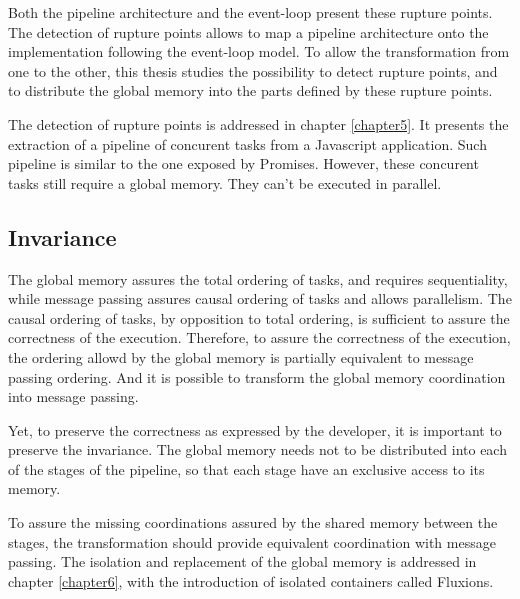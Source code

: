 Both the pipeline architecture and the event-loop present these rupture points.
The detection of rupture points allows to map a pipeline architecture onto the implementation following the event-loop model.
To allow the transformation from one to the other, this thesis studies the possibility to detect rupture points, and to distribute the global memory into the parts defined by these rupture points.

The detection of rupture points is addressed in chapter \ref{chapter5}.
It presents the extraction of a pipeline of concurent tasks from a Javascript application.
Such pipeline is similar to the one exposed by Promises.
However, these concurent tasks still require a global memory.
They can't be executed in parallel.

\subsection{Invariance}


The global memory assures the total ordering of tasks, and requires sequentiality, while message passing assures causal ordering of tasks and allows parallelism.
The causal ordering of tasks, by opposition to total ordering, is sufficient to assure the correctness of the execution.
Therefore, to assure the correctness of the execution, the ordering allowd by the global memory is partially equivalent to message passing ordering.
And it is possible to transform the global memory coordination into message passing.

Yet, to preserve the correctness as expressed by the developer, it is important to preserve the invariance.
The global memory needs not to be distributed into each of the stages of the pipeline, so that each stage have an exclusive access to its memory.

To assure the missing coordinations assured by the shared memory between the stages, the transformation should provide equivalent coordination with message passing.
The isolation and replacement of the global memory is addressed in chapter \ref{chapter6}, with the introduction of isolated containers called Fluxions.




